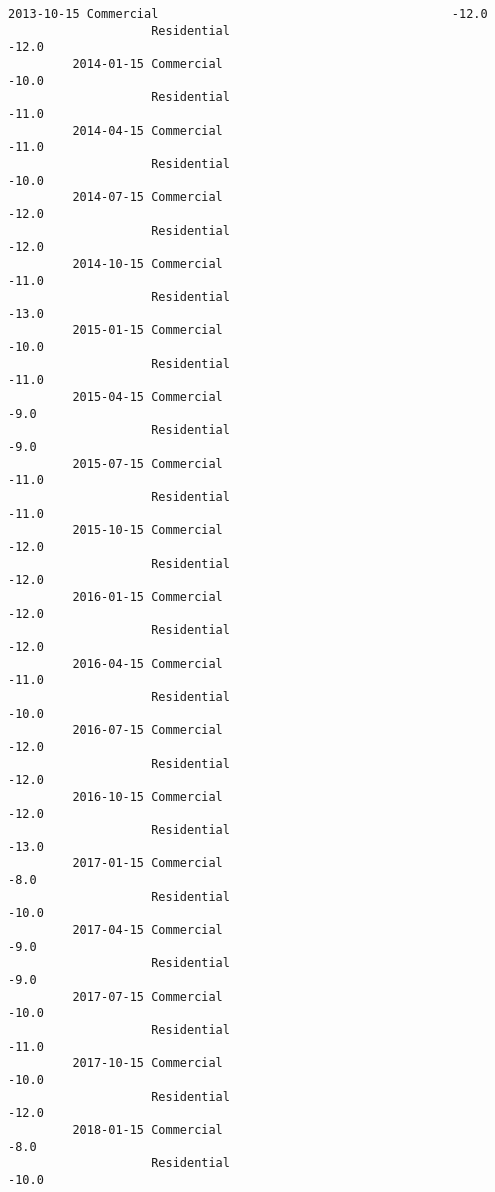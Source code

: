 \documentclass[11pt]{article}
\begin{document}
\begin{Verbatim}[commandchars=\\\{\}]
         2013-10-15 Commercial                                         -12.0   
                    Residential                                        -12.0   
         2014-01-15 Commercial                                         -10.0   
                    Residential                                        -11.0   
         2014-04-15 Commercial                                         -11.0   
                    Residential                                        -10.0   
         2014-07-15 Commercial                                         -12.0   
                    Residential                                        -12.0   
         2014-10-15 Commercial                                         -11.0   
                    Residential                                        -13.0   
         2015-01-15 Commercial                                         -10.0   
                    Residential                                        -11.0   
         2015-04-15 Commercial                                          -9.0   
                    Residential                                         -9.0   
         2015-07-15 Commercial                                         -11.0   
                    Residential                                        -11.0   
         2015-10-15 Commercial                                         -12.0   
                    Residential                                        -12.0   
         2016-01-15 Commercial                                         -12.0   
                    Residential                                        -12.0   
         2016-04-15 Commercial                                         -11.0   
                    Residential                                        -10.0   
         2016-07-15 Commercial                                         -12.0   
                    Residential                                        -12.0   
         2016-10-15 Commercial                                         -12.0   
                    Residential                                        -13.0   
         2017-01-15 Commercial                                          -8.0   
                    Residential                                        -10.0   
         2017-04-15 Commercial                                          -9.0   
                    Residential                                         -9.0   
         2017-07-15 Commercial                                         -10.0   
                    Residential                                        -11.0   
         2017-10-15 Commercial                                         -10.0   
                    Residential                                        -12.0   
         2018-01-15 Commercial                                          -8.0   
                    Residential                                        -10.0   
         

\end{Verbatim}
\end{document}
